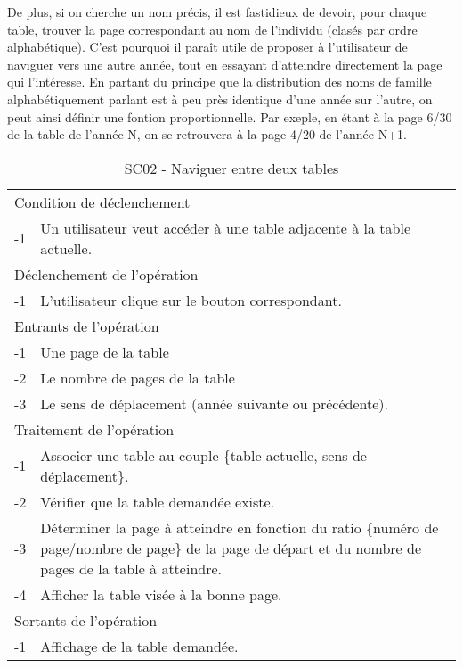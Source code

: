 \documentclass[a4paper]{article}
\begin{document}
De plus, si on cherche un nom précis, il est fastidieux de devoir, pour chaque table, trouver la page correspondant au nom de l'individu (clasés par ordre alphabétique). C'est pourquoi il paraît utile de proposer à l'utilisateur de naviguer vers une autre année, tout en essayant d'atteindre directement la page qui l'intéresse. En partant du principe que la distribution des noms de famille alphabétiquement parlant est à peu près identique d'une année sur l'autre, on peut ainsi définir une fontion proportionnelle. Par exeple, en étant à la page 6/30 de la table de l'année N, on se retrouvera à la page 4/20 de l'année N+1.

\begin{table}[H]
  \centering
   \small
	\begin{tabular}{|c|p{12cm}|}
   		\hline
   			\rowcolor{lightgray}\multicolumn{2}{|c|}{\textbf{SC02 - Naviguer entre deux tables}} \\
   		\hline
   			\multicolumn{2}{|l|}{Condition de d\'eclenchement} \\
   		\hline
   		-1 & Un utilisateur veut acc\'eder \`a une table adjacente à la table actuelle. \\
   		\hline
   			\multicolumn{2}{|l|}{D\'eclenchement de l'op\'eration} \\
   		\hline
   			-1 & L'utilisateur clique sur le bouton correspondant. \\
   		\hline
   			\multicolumn{2}{|l|}{Entrants de l'op\'eration} \\
   		\hline
   			-1 & Une page de la table \\
        	-2 & Le nombre de pages de la table \\ 
            -3 & Le sens de déplacement (année suivante ou précédente). \\
   		\hline
   			\multicolumn{2}{|l|}{Traitement de l'op\'eration} \\
  		\hline
   			-1 & Associer une table au couple \{table actuelle, sens de d\'eplacement\}.  \\
        	-2 & V\'erifier que la table demand\'ee existe. \\
        	-3 & Déterminer la page à atteindre en fonction du ratio \{numéro de page/nombre de page\} de la page de départ et du nombre de pages de la table à atteindre. \\
            -4 & Afficher la table visée à la bonne page. \\
   		\hline
   			\multicolumn{2}{|l|}{Sortants de l'op\'eration} \\
   		\hline
   			-1 & Affichage de la table demand\'ee. \\
   		\hline
	\end{tabular}
  \caption{SC02 - Naviguer entre deux tables}
  \normalsize
  \label{tab:naviguer_deux_tables}
\end{table}
\newpage
\end{document}
